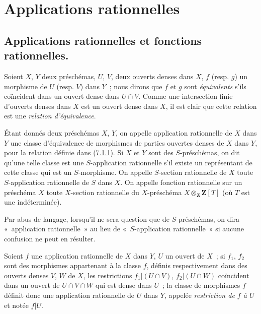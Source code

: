 \section{Applications rationnelles}
\label{section:I.7-fr}

\subsection{Applications rationnelles et fonctions rationnelles.}
\label{subsection:I.7.1-fr}

\begin{env}[7.1.1]
\label{I.7.1.1-fr}
Soient $X$, $Y$ deux préschémas, $U$, $V$, deux ouverts denses dans $X$, $f$
(resp. $g$) un morphisme de $U$ (resp. $V$) dans $Y$~; nous dirons que $f$ et
$g$ sont
\emph{équivalents} s'ils coïncident dans un ouvert dense dans $U\cap V$.
Comme une intersection finie d'ouverts denses dans $X$ est un ouvert dense
dans $X$, il est clair que cette relation est une
\emph{relation d'équivalence}.
\end{env}

\begin{definition}[7.1.2]
\label{I.7.1.2-fr}
Étant donnés deux préschémas $X$, $Y$, on appelle
application rationnelle de $X$ dans $Y$ une classe d'équivalence de
morphismes de parties ouvertes denses de $X$ dans $Y$, pour la relation
définie dans \textup{(\hyperref[I.7.1.1-fr]{7.1.1})}. Si $X$ et $Y$ sont des
$S$-préschémas, on dit qu'une telle classe est une
$S$-application rationnelle s'il existe un représentant de cette classe
qui est un $S$-morphisme. On appelle
$S$-section rationnelle de $X$ toute $S$-application rationnelle de $S$
dans $X$. On appelle
fonction rationnelle sur un préschéma $X$ toute $X$-section rationnelle
du $X$-préschéma $X\otimes_{\mathbf{Z}}\mathbf{Z}[T]$ (où $T$ est une
indéterminée).
\end{definition}

Par abus de langage, lorsqu'il ne sera question que de $S$-préschémas, on dira
«~application rationnelle~» au lieu de «~$S$-application rationnelle~» si
aucune confusion ne peut en résulter.

Soient $f$ une application rationnelle de $X$ dans $Y$, $U$ un ouvert de
$X$~; si $f_1$, $f_2$ sont des morphismes appartenant à la classe $f$, définis
respectivement dans des ouverts denses $V$, $W$ de $X$, les restrictions
$f_1|(U\cap V)$, $f_2|(U\cap W)$ coïncident dans un ouvert de $U\cap V\cap W$ qui est dense
dans $U$~; la classe de morphismes $f$ définit donc une application rationnelle
de $U$ dans $Y$, appelée
\emph{restriction de $f$ à $U$} et notée $f|U$.

